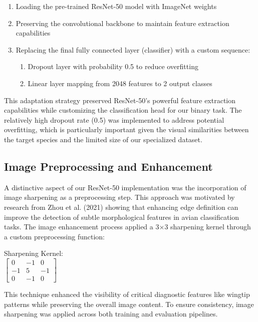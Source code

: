 \begin{enumerate}
    \item Loading the pre-trained ResNet-50 model with ImageNet weights
    \item Preserving the convolutional backbone to maintain feature extraction capabilities
    \item Replacing the final fully connected layer (classifier) with a custom sequence:
    \begin{enumerate}
        \item Dropout layer with probability 0.5 to reduce overfitting
        \item Linear layer mapping from 2048 features to 2 output classes
    \end{enumerate}
\end{enumerate}

This adaptation strategy preserved ResNet-50's powerful feature extraction capabilities while customizing the classification head for our binary task. The relatively high dropout rate (0.5) was implemented to address potential overfitting, which is particularly important given the visual similarities between the target species and the limited size of our specialized dataset\cite{stackoverflow}.

\subsection{Image Preprocessing and Enhancement}

A distinctive aspect of our ResNet-50 implementation was the incorporation of image sharpening as a preprocessing step. This approach was motivated by research from Zhou et al. (2021) showing that enhancing edge definition can improve the detection of subtle morphological features in avian classification tasks. The image enhancement process applied a 3$\times$3 sharpening kernel through a custom preprocessing function:

\begin{center}
Sharpening Kernel: \\
$\begin{bmatrix}
0 & -1 & 0 \\
-1 & 5 & -1 \\
0 & -1 & 0
\end{bmatrix}$
\end{center}

This technique enhanced the visibility of critical diagnostic features like wingtip patterns while preserving the overall image content. To ensure consistency, image sharpening was applied across both training and evaluation pipelines\cite{jatit}.

